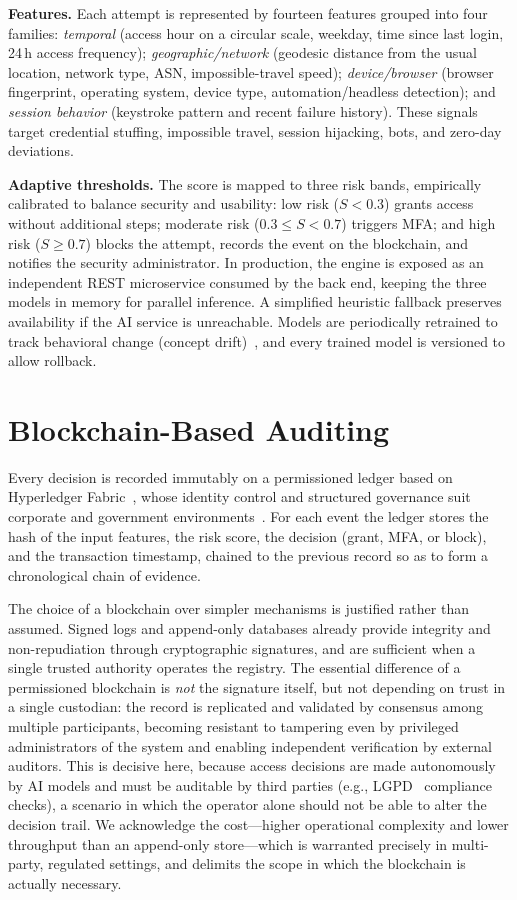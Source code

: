 \documentclass[conference]{IEEEtran}
\begin{document}
\textbf{Features.} Each attempt is represented by fourteen features
grouped into four families: \emph{temporal} (access hour on a circular
scale, weekday, time since last login, 24\,h access frequency);
\emph{geographic/network} (geodesic distance from the usual location,
network type, ASN, impossible-travel speed); \emph{device/browser}
(browser fingerprint, operating system, device type,
automation/headless detection); and \emph{session behavior} (keystroke
pattern and recent failure history). These signals target credential
stuffing, impossible travel, session hijacking, bots, and
zero-day deviations.

\textbf{Adaptive thresholds.} The score is mapped to three risk bands,
empirically calibrated to balance security and usability: low risk
($S<0.3$) grants access without additional steps; moderate risk
($0.3\le S<0.7$) triggers MFA; and high risk ($S\ge0.7$) blocks the
attempt, records the event on the blockchain, and notifies the security
administrator. In production, the engine is exposed as an independent
REST microservice consumed by the back end, keeping the
three models in memory for parallel inference. A simplified heuristic
fallback preserves availability if the AI service is unreachable.
Models are periodically retrained to track behavioral change (concept
drift)~\cite{gama2014}, and every trained model is versioned to allow
rollback.

\section{Blockchain-Based Auditing}
\label{sec:bc}
Every decision is recorded immutably on a permissioned ledger based on
Hyperledger Fabric~\cite{fabric2024}, whose identity control and
structured governance suit corporate and government
environments~\cite{nistir8202}. For each event the ledger stores the
hash of the input features, the risk score, the decision (grant, MFA,
or block), and the transaction timestamp, chained to the previous
record so as to form a chronological chain of evidence.

The choice of a blockchain over simpler mechanisms is justified rather
than assumed. Signed logs and append-only databases already provide
integrity and non-repudiation through cryptographic signatures, and are
sufficient when a single trusted authority operates the registry. The
essential difference of a permissioned blockchain is \emph{not} the
signature itself, but not depending on trust in a single custodian: the
record is replicated and validated by consensus among multiple
participants, becoming resistant to tampering even by privileged
administrators of the system and enabling independent verification by
external auditors. This is decisive here, because access decisions are
made autonomously by AI models and must be auditable by third parties
(e.g., LGPD~\cite{lgpd2018} compliance checks), a scenario in which the
operator alone should not be able to alter the decision trail. We
acknowledge the cost---higher operational complexity and lower
throughput than an append-only store---which is warranted precisely in
multi-party, regulated settings, and delimits the scope in which the
blockchain is actually necessary.
\end{document}
